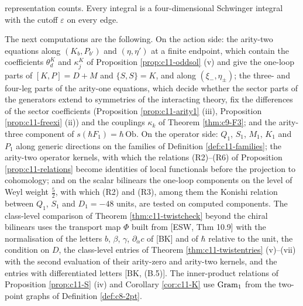 \begin{remark}
representation counts. Every integral is a four-dimensional Schwinger integral with the cutoff $\varepsilon$ on every edge.
\end{remark}

\begin{remark}
\label{rem:c11-next}
The next computations are the following. On the action side: the arity-two equations along $(K_b,P_{b'})$ and $(\eta,\eta')$ at a finite endpoint, which contain the coefficients $\theta^K_d$ and $\kappa^K_j$ of Proposition \ref{prop:c11-oddsol} (v) and give the one-loop parts of $[K,P]=D+M$ and $\{S,S\}=K$, and along $(\xi_-,\eta_\pm)$; the three- and four-leg parts of the arity-one equations, which decide whether the sector parts of the generators extend to symmetries of the interacting theory, fix the differences of the sector coefficients (Proposition \ref{prop:c11-arity1} (iii), Proposition \ref{prop:c11-freexi} (ii)) and the couplings $\kappa_k$ of Theorem \ref{thm:c9-F3}; and the arity-three component of $s(\hbar F_1)=\hbar\,\mathrm{Ob}$. On the operator side: $Q_1$, $S_1$, $M_1$, $K_1$ and $P_1$ along generic directions on the families of Definition \ref{def:c11-families}; the arity-two operator kernels, with which the relations (R2)--(R6) of Proposition \ref{prop:c11-relations} become identities of local functionals before the projection to cohomology; and on the scalar bilinears the one-loop components on the level of Weyl weight $\tfrac52$, with which (R2) and (R3), among them the Konishi relation between $Q_1$, $S_1$ and $D_1=-48$ units, are tested on computed components. The class-level comparison of Theorem \ref{thm:c11-twistcheck} beyond the chiral bilinears uses the transport map $\Phi$ built from [ESW, Thm 10.9] with the normalisation of the letters $b$, $\beta$, $\gamma$, $\partial_{\dot\alpha}c$ of [BK] and of $\hbar$ relative to the unit, the condition on $D$, the class-level entries of Theorem \ref{thm:c11-twistentries} (v)--(vii) with the second evaluation of their arity-zero and arity-two kernels, and the entries with differentiated letters [BK, (B.5)]. The inner-product relations of Proposition \ref{prop:c11-S} (iv) and Corollary \ref{cor:c11-K} use $\mathrm{Gram}_{\rm 1}$ from the two-point graphs of Definition \ref{def:c8-2pt}.
\end{remark}

